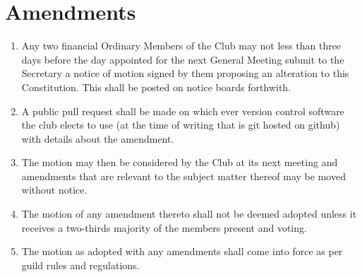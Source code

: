 \documentclass[10pt,a4paper]{report}
\begin{document}
	\section{Amendments}
		\begin{enumerate}[label=\alph*]
			\item Any two financial Ordinary Members of the Club may not less than three days before the day appointed for the next General Meeting submit to the Secretary a notice of motion signed by them proposing an alteration to this Constitution. This shall be posted on notice boards forthwith.
			\item A public pull request shall be made on which ever version control software the club elects to use (at the time of writing that is git hosted on github) with details about the amendment.
			\item The motion may then be considered by the Club at its next meeting and amendments that are relevant to the subject matter thereof may be moved without notice.
			\item The motion of any amendment thereto shall not be deemed adopted unless it receives a two-thirds majority of the members present and voting.
			\item The motion as adopted with any amendments shall come into force as per guild rules and regulations.
		\end{enumerate}
\end{document}
